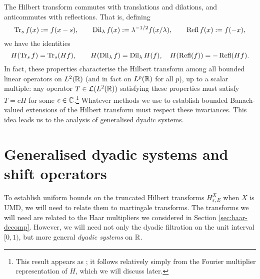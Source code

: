 The Hilbert transform commutes with translations and dilations, and anticommutes with reflections.
That is, defining
\begin{equation}\label{eq:symmetries}
  \operatorname{Tr}_{s} f (x) := f(x - s), \qquad \operatorname{Dil}_{\lambda} f(x) := \lambda^{-1/2}f(x/\lambda), \qquad   \operatorname{Refl} f(x) := f(-x),
\end{equation}
we have the identities
\begin{equation*}
  H(\operatorname{Tr}_{s} f) = \operatorname{Tr}_{s} (Hf), \qquad H(\operatorname{Dil}_{\lambda} f) = \operatorname{Dil}_{\lambda} H(f), \quad H(\operatorname{Refl}(f)) = -\operatorname{Refl}(Hf).
\end{equation*}
In fact, these properties characterise the Hilbert transform among all bounded linear operators on $L^2(\mathbb{R})$ (and in fact on $L^p(\mathbb{R})$ for all $p$), up to a scalar multiple: any operator $T \in \mathcal{L}(L^2(\mathbb{R}))$ satisfying these properties must satisfy $T = cH$ for some $c \in \mathbb{C}$.\footnote{This result appears as \cite[Exercise 5.1.11]{grafakos}; it follows relatively simply from the Fourier multiplier representation of $H$, which we will discuss later.}
Whatever methods we use to establish bounded Banach-valued extensions of the Hilbert transform must respect these invariances.
This idea leads us to the analysis of generalised dyadic systems.

\section{Generalised dyadic systems and shift operators}

To establish uniform bounds on the truncated Hilbert transforms $H_{\varepsilon, E}^{X}$ when $X$ is UMD, we will need to relate them to martingale transforms.
The transforms we will need are related to the Haar multipliers we considered in Section \ref{sec:haar-decomp}.
However, we will need not only the dyadic filtration on the unit interval $[0,1)$, but more general \emph{dyadic systems} on $\mathbb{R}$.

